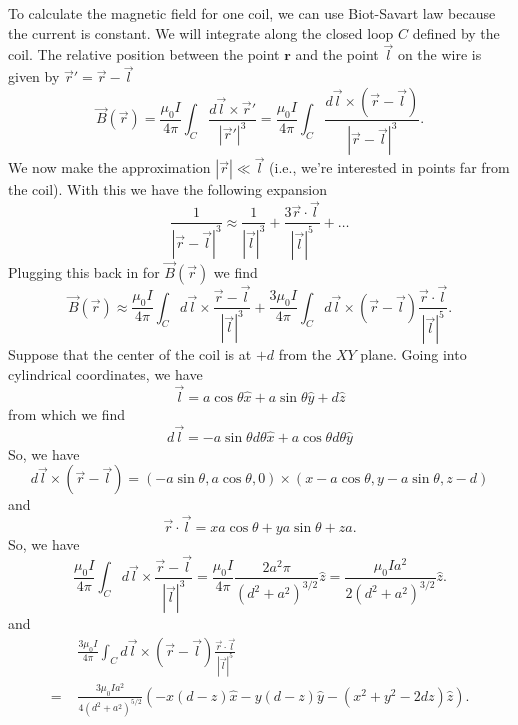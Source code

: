 \documentclass{article}
\theoremstyle{definition}
\newcommand{\f}[2]{\frac{#1}{#2}}
\begin{document}
To calculate the magnetic field for one coil, we can use Biot-Savart law because the current is constant. We will integrate along the closed loop $C$ defined by the coil. The relative position between the point $\mathbf{r}$ and the point $\vec{l}$ on the wire is given by $\vec{r}' = \vec{r} - \vec{l}$
\begin{equation*}
\vec{B}(\vec{r}) = \f{\mu_0 I}{4\pi} \int_C \f{d\vec{l} \times \vec{r}'}{ |{\vec{r}'}|^3} = \f{\mu_0 I}{4\pi} \int_C \f{d\vec{l} \times (\vec{r} - \vec{l})}{|{\vec{r} - \vec{l}}|^3}.  
\end{equation*}
We now make the approximation $|\vec{r}| \ll \vec{l}$ (i.e., we're interested in points far from the coil). With this we have the following expansion
\begin{equation*}
\f{1}{|\vec{r} - \vec{l}|^3} \approx \f{1}{|\vec{l}|^3} + \f{3 \vec{r}\cdot \vec{l}}{|\vec{l}|^5} + \dots
\end{equation*}
Plugging this back in for $\vec{B}(\vec{r})$ we find 
\begin{equation*}
\vec{B}(\vec{r}) \approx \f{\mu_0 I}{4\pi}\int_C d\vec{l}\times \f{\vec{r} - \vec{l}}{|\vec{l}|^3} + \f{3\mu_0 I}{4\pi} \int_C d\vec{l} \times (\vec{r} - \vec{l}) \f{\vec{r}\cdot \vec{l}}{|\vec{l}|^5}.
\end{equation*}
Suppose that the center of the coil is at $+d$ from the $XY$ plane. Going into cylindrical coordinates, we have
\begin{equation*}
\vec{l} = a\cos\theta\hat{x} + a\sin\theta\hat{y} + d\hat{z}
\end{equation*}
from which we find 
\begin{equation*}
d\vec{l} = -a\sin\theta d\theta\hat{x} + a\cos\theta d\theta \hat{y}
\end{equation*}
So, we have
\begin{equation*}
d\vec{l} \times (\vec{r} - \vec{l}) = (-a\sin\theta, a\cos\theta,0)\times(x-a\cos\theta,y-a\sin\theta,z-d)
\end{equation*}
and 
\begin{equation*}
\vec{r}\cdot \vec{l} = xa\cos\theta + ya\sin\theta + za.
\end{equation*}
So, we have
\begin{equation*}
\f{\mu_0 I}{4\pi}\int_C d\vec{l}\times \f{\vec{r} - \vec{l}}{|\vec{l}|^3} = \f{\mu_0 I }{4\pi} \f{2a^2 \pi}{(d^2 + a^2)^{3/2}} \hat{z} = \f{\mu_0 I a^2}{2(d^2 + a^2)^{3/2}} \hat{z}.
\end{equation*}
and 
\begin{align*}
&\f{3\mu_0 I }{4\pi}\int_C d\vec{l}\times (\vec{r} - \vec{l}) \f{\vec{r}\cdot \vec{l}}{|\vec{l}|^5}\\ 
=\,\, &\f{3\mu_0 Ia^2}{4(d^2+a^2)^{5/2}} \left(- x(d-z)\hat{x}  - y (d-z)\hat{y} -  (x^2 + y^2 - 2dz)\hat{z}\right).
\end{align*}
\end{document}
